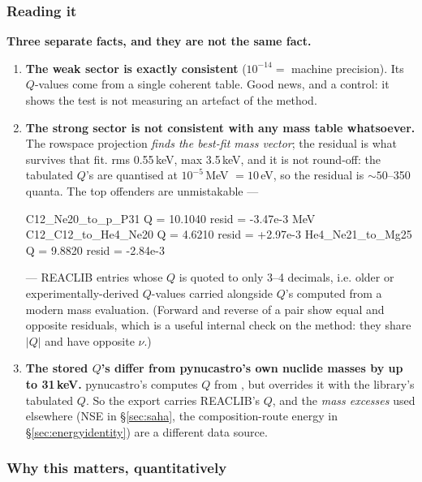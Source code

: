 \subsubsection{Reading it}
\label{sec:wegscheider-reading}

\textbf{Three separate facts, and they are not the same fact.}

\begin{enumerate}
\item \textbf{The weak sector is exactly consistent} ($10^{-14} =$ machine
  precision). Its $Q$-values come from a single coherent table. Good news, and a
  control: it shows the test is not measuring an artefact of the method.

\item \textbf{The strong sector is not consistent with any mass table
  whatsoever.} The rowspace projection \emph{finds the best-fit mass vector};
  the residual is what survives that fit. rms 0.55\,keV, max 3.5\,keV, and it is
  not round-off: the tabulated $Q$'s are quantised at $10^{-5}$\,MeV $= 10$\,eV,
  so the residual is ${\sim}50$--350 quanta. The top offenders are unmistakable
  ---

\begin{srclisting}
C12_Ne20_to_p_P31      Q =  10.1040   resid = -3.47e-3 MeV
C12_C12_to_He4_Ne20    Q =   4.6210   resid = +2.97e-3
He4_Ne21_to_Mg25       Q =   9.8820   resid = -2.84e-3
\end{srclisting}

  --- REACLIB entries whose $Q$ is quoted to only 3--4 decimals, i.e. older or
  experimentally-derived $Q$-values carried alongside $Q$'s computed from a
  modern mass evaluation. (Forward and reverse of a pair show equal and opposite
  residuals, which is a useful internal check on the method: they share $|Q|$
  and have opposite $\nu$.)

\item \textbf{The stored $Q$'s differ from pynucastro's own nuclide masses by up
  to 31\,keV.} pynucastro's  computes $Q$ from
  , but  overrides it with the library's
  tabulated $Q$. So the export carries REACLIB's $Q$, and the \emph{mass
  excesses} used elsewhere (NSE in \S\ref{sec:saha}, the composition-route
  energy in \S\ref{sec:energyidentity}) are a different data source.
\end{enumerate}

\subsubsection{Why this matters, quantitatively}
\label{sec:wegscheider-why}

